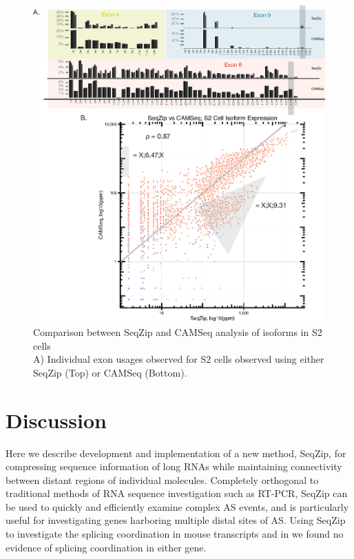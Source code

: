 		\begin{figure} %
			  \centering 
			  \includegraphics{Figures/SeqZipPaper/Roy2014FigS5.eps}
			  \caption[Comparison between SeqZip and CAMSeq analysis of \dscam{} isoforms in S2 cells]
			  {Comparison between SeqZip and CAMSeq analysis of \dscam{} isoforms in S2 cells \\[0.25cm]
			    A) Individual exon usages observed for S2 cells observed using either SeqZip (Top) or CAMSeq (Bottom). 
			    }
			  \label{SeqZipPaper:fig:Roy2014 FS5}
			  \end{figure}

\section{Discussion}
	\label{SeqZipPaper:sec:Discussion}

	Here we describe development and implementation of a new method, SeqZip, for compressing sequence information of long RNAs while maintaining connectivity between distant regions of individual molecules. Completely orthogonal to traditional methods of RNA sequence investigation such as RT-PCR, SeqZip can be used to quickly and efficiently examine complex AS events, and is particularly useful for investigating genes harboring multiple distal sites of AS. Using SeqZip to investigate the splicing coordination in mouse \fn{} transcripts and in \flies{} \dscam{} we found no evidence of splicing coordination in either gene. 

